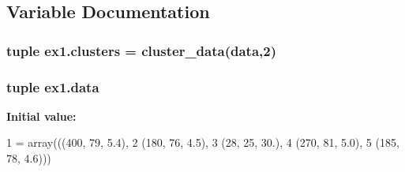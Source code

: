 \subsection{Variable Documentation}
\hypertarget{namespaceex1_abb238178e545e6cdfc67281bc438459a}{}
\subsubsection[{clusters}]{\setlength{\rightskip}{0pt plus 5cm}tuple ex1.\+clusters = {\bf cluster\+\_\+data}({\bf data},2)}\label{namespaceex1_abb238178e545e6cdfc67281bc438459a}
\hypertarget{namespaceex1_a7804ba98b19aca59b03a86c08148ae15}{}
\subsubsection[{data}]{\setlength{\rightskip}{0pt plus 5cm}tuple ex1.\+data}\label{namespaceex1_a7804ba98b19aca59b03a86c08148ae15}
{\bfseries Initial value\+:}
\begin{DoxyCode}
1 = array(((400, 79, 5.4),
2              (180, 76, 4.5),
3              (28, 25, 30.),
4              (270, 81, 5.0),
5              (185, 78, 4.6)))
\end{DoxyCode}

